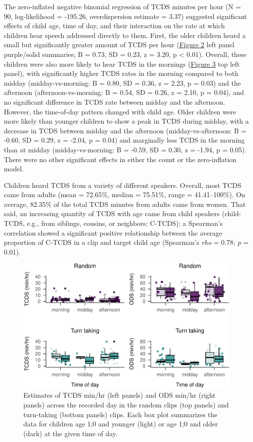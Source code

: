 \documentclass[,man,floatsintext]{apa6}
\begin{document}
The zero-inflated negative binomial regression of TCDS minutes per hour
(N = 90, log-likelihood = -195.26, overdispersion estimate = 3.37)
suggested significant effects of child age, time of day, and their
interaction on the rate at which children hear speech addressed directly
to them. First, the older children heard a small but significantly
greater amount of TCDS per hour (\protect\hyperlink{fig2}{Figure 2} left
panel purple/solid summaries; B = 0.73, SD = 0.23, z = 3.20, p
\textless{} 0.01). Overall, these children were also more likely to hear
TCDS in the mornings (\protect\hyperlink{fig3}{Figure 3} top left
panel), with significantly higher TCDS rates in the morning compared to
both midday (midday-vs-morning: B = 0.80, SD = 0.36, z = 2.23, p = 0.03)
and the afternoon (afternoon-vs-morning: B = 0.54, SD = 0.26, z = 2.10,
p = 0.04), and no significant difference in TCDS rate between midday and
the afternoon. However, the time-of-day pattern changed with child age.
Older children were more likely than younger children to show a peak in
TCDS during midday, with a decrease in TCDS between midday and the
afternoon (midday-vs-afternoon: B = -0.60, SD = 0.29, z = -2.04, p =
0.04) and marginally less TCDS in the morning than at midday
(midday-vs-morning: B = -0.59, SD = 0.30, z = -1.94, p = 0.05). There
were no other significant effects in either the count or the
zero-inflation model.

Children heard TCDS from a variety of different speakers. Overall, most
TCDS came from adults (mean = 72.65\%, median = 75.51\%, range =
41.41--100\%). On average, 82.35\% of the total TCDS minutes from adults
came from women. That said, an increasing quantity of TCDS with age came
from child speakers (child-TCDS, e.g., from siblings, cousins, or
neighbors; C-TCDS); a Spearman's correlation showed a significant
positive relationship between the average proportion of C-TCDS in a clip
and target child age (Spearman's \emph{rho} = 0.78; \emph{p} = 0.01).

\begin{figure}
\centering
\includegraphics{Yeli-CLE_files/figure-latex/fig3-1.pdf}
\caption{\label{fig:fig3}Estimates of TCDS min/hr (left panels) and ODS
min/hr (right panels) across the recorded day in the random clips (top
panels) and turn-taking (bottom panels) clips. Each box plot summarizes
the data for children age 1;0 and younger (light) or age 1;0 and older
(dark) at the given time of day.}
\end{figure}
\end{document}
